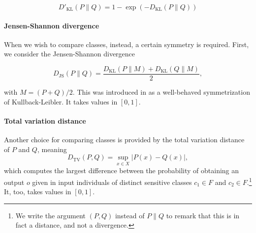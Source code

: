 \documentclass[
]{ceurart}
\begin{document}
\[D'_{\mathrm{KL}}(P\parallel Q)=1-\exp (- D_{\mathrm{KL}}(P\parallel Q))\]

\paragraph{Jensen-Shannon divergence}
When we wish to compare classes, instead, a certain symmetry is required. First, we consider the Jensen-Shannon divergence 

\[D_{\mathrm{JS}}(P\parallel Q)=\frac{D_{\mathrm{KL}}(P\parallel M)+D_{\mathrm{KL}}(Q\parallel M)}{2},\]

with $M=(P+Q)/2$. This was introduced in \cite{lin_divergence} as a well-behaved symmetrization of Kullback-Leibler. It takes values in $[0,1]$.

\paragraph{Total variation distance}
Another choice for comparing classes is provided by the total variation distance of $P$ and $Q$, meaning
\[D_{\mathrm{TV}}(P, Q)= \sup _{x\in X} \vert P(x) - Q(x)\vert,\]
which computes the largest difference between the probability of obtaining an output $o$ given in input individuals of distinct sensitive classes $c_1\in F$ and $c_2\in F$.\footnote{We write the argument $(P,Q)$ instead of $P\parallel Q$ to remark that this is in fact a distance, and not a divergence.}  It, too, takes values in $[0,1]$. %

%

%
\end{document}
